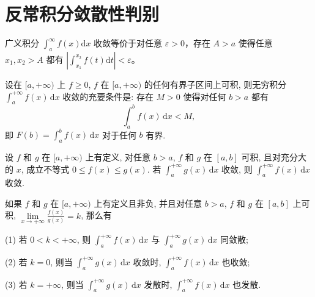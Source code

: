 \documentclass[../../main.tex]{subfiles}
\begin{document}
\section{反常积分敛散性判别}

\begin{theorem}[Cauchy收敛准则]
广义积分 \(\int_{a}^{\infty} f(x) \mathrm{d}x\) 收敛等价于对任意 \(\varepsilon > 0\)，存在 \(A > a\) 使得任意 \(x_1,x_2 > A\) 都有 \(\left|\int_{x_1}^{x_2} f(t) \mathrm{d}t\right| < \varepsilon\)。 
\end{theorem}

\begin{theorem}
设在 $[a, +\infty)$ 上 $f \geqslant 0$, $f$ 在 $[a, +\infty)$ 的任何有界子区间上可积, 则无穷积分 $\int_a^{+\infty} f(x) \, \mathrm{d}x$ 收敛的充要条件是: 存在 $M > 0$ 使得对任何 $b > a$ 都有
\[
\int_a^b f(x) \, \mathrm{d}x < M,
\]
即 $F(b) = \int_a^b f(x) \, \mathrm{d}x$ 对于任何 $b$ 有界.
\end{theorem}

\begin{theorem}[比较判别法]
设 \( f \) 和 \( g \) 在 \([a, +\infty)\) 上有定义, 对任意 \( b > a \), \( f \) 和 \( g \) 在 \([a, b]\) 可积, 且对充分大的 \( x \), 成立不等式 \( 0 \leqslant f(x) \leqslant g(x) \). 若 \( \int_a^{+\infty} g(x) \, \mathrm{d}x \) 收敛, 则 \( \int_a^{+\infty} f(x) \, \mathrm{d}x \) 收敛.
\end{theorem}

\begin{theorem}[比较判别法极限形式]
如果 \( f \) 和 \( g \) 在 \([a, +\infty)\) 上有定义且非负, 并且对任意 \( b > a \), \( f \) 和 \( g \) 在 \([a, b]\) 上可积, \( \lim\limits_{x \to +\infty} \frac{f(x)}{g(x)} = k \), 那么有

(1) 若 \( 0 < k < +\infty \), 则 \( \int_a^{+\infty} f(x) \, \mathrm{d}x \) 与 \( \int_a^{+\infty} g(x) \, \mathrm{d}x \) 同敛散;

(2) 若 \( k = 0 \), 则当 \( \int_a^{+\infty} g(x) \, \mathrm{d}x \) 收敛时, \( \int_a^{+\infty} f(x) \, \mathrm{d}x \) 也收敛;

(3) 若 \( k = +\infty \), 则当 \( \int_a^{+\infty} g(x) \, \mathrm{d}x \) 发散时, \( \int_a^{+\infty} f(x) \, \mathrm{d}x \) 也发散.
\end{theorem}
\end{document}
